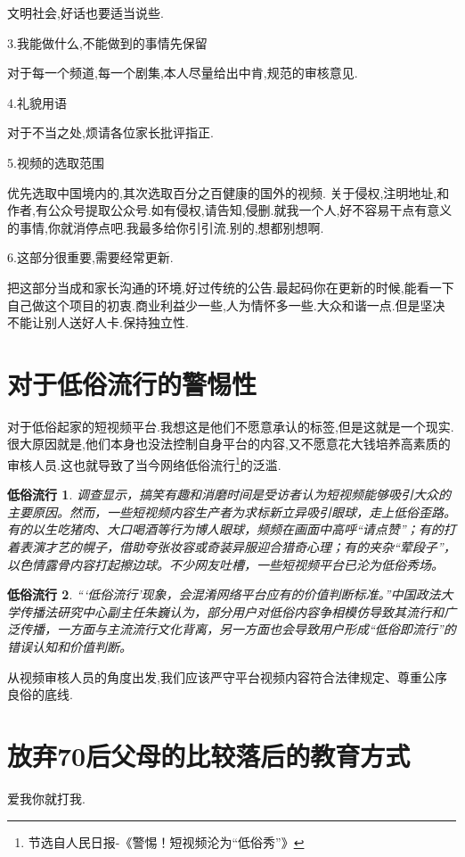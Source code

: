 \documentclass[UTF8]{ctexart}
\begin{document}
文明社会,好话也要适当说些.

3.我能做什么,不能做到的事情先保留

对于每一个频道,每一个剧集,本人尽量给出中肯,规范的审核意见.

4.礼貌用语

对于不当之处,烦请各位家长批评指正.

5.视频的选取范围

优先选取中国境内的,其次选取百分之百健康的国外的视频.
关于侵权,注明地址,和作者,有公众号提取公众号.如有侵权,请告知,侵删.就我一个人,好不容易干点有意义的事情,你就消停点吧.我最多给你引引流.别的,想都别想啊.

6.这部分很重要,需要经常更新.

把这部分当成和家长沟通的环境,好过传统的公告.最起码你在更新的时候,能看一下自己做这个项目的初衷.商业利益少一些,人为情怀多一些.大众和谐一点.但是坚决不能让别人送好人卡.保持独立性.


\section{对于低俗流行的警惕性}
对于低俗起家的短视频平台.我想这是他们不愿意承认的标签,但是这就是一个现实.很大原因就是,他们本身也没法控制自身平台的内容,又不愿意花大钱培养高素质的审核人员.这也就导致了当今网络低俗流行\footnote{节选自人民日报-《警惕！短视频沦为“低俗秀”》}的泛滥.

\newtheorem{badEnv}{低俗流行}

\begin{badEnv}
调查显示，搞笑有趣和消磨时间是受访者认为短视频能够吸引大众的主要原因。然而，一些短视频内容生产者为求标新立异吸引眼球，走上低俗歪路。有的以生吃猪肉、大口喝酒等行为博人眼球，频频在画面中高呼“请点赞”；有的打着表演才艺的幌子，借助夸张妆容或奇装异服迎合猎奇心理；有的夹杂“荤段子”，以色情露骨内容打起擦边球。不少网友吐槽，一些短视频平台已沦为低俗秀场。	
\end{badEnv}

\begin{badEnv}
“‘低俗流行’现象，会混淆网络平台应有的价值判断标准。”中国政法大学传播法研究中心副主任朱巍认为，部分用户对低俗内容争相模仿导致其流行和广泛传播，一方面与主流流行文化背离，另一方面也会导致用户形成“低俗即流行”的错误认知和价值判断。
\end{badEnv}

从视频审核人员的角度出发,我们应该严守平台视频内容符合法律规定、尊重公序良俗的底线.

\section{放弃70后父母的比较落后的教育方式}
爱我你就打我.
\end{document}
